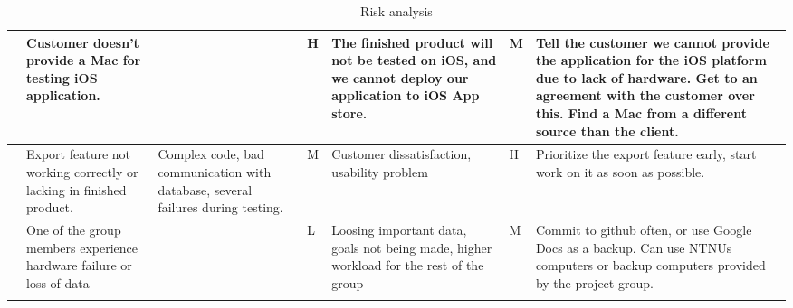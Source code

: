 \begin{landscape}
\begin{longtable}{| p{0.4cm} | p{4cm} | p{4cm} | p{2cm} | p{4cm} | p{1cm} | p{4cm} |}
	\stepcounter{riskId}
	\centering
		\arabic{riskId} &
        Customer doesn’t provide a Mac for testing iOS application. &
		& \centering H &
		The finished product will not be tested on iOS, and we cannot deploy our application to iOS App store. &
		\centering  M &
		Tell the customer we cannot provide the application for the iOS platform due to lack of hardware. Get to an agreement with the customer over this. Find a Mac from a different source than the client. \\
	\hline

	\stepcounter{riskId}
	\centering
		\arabic{riskId} &
        Export feature not working correctly or lacking in finished product. &
		Complex code, bad communication with database, several failures during testing. &
		\centering  M &
		Customer dissatisfaction, usability problem &
		\centering H &
		Prioritize the export feature early, start work on it as soon as possible. \\
	\hline

	\stepcounter{riskId}
	\centering
		\arabic{riskId} &
        One of the group members experience hardware failure or loss of data &
		& \centering L &
		Loosing important data, goals not being made, higher workload for the rest of the group &
		\centering M &
		Commit to github often, or use Google Docs as a backup. Can use NTNUs computers or backup computers provided by the project group. \\
	\hline
\caption{Risk analysis}
\end{longtable}

\end{landscape}

